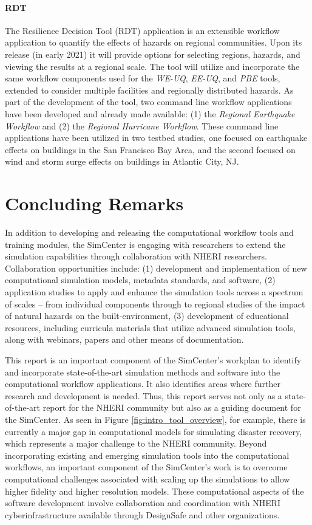 \paragraph{RDT} The Resilience Decision Tool (RDT) application is an extensible workflow application to quantify the effects of hazards on regional communities. Upon its release (in early 2021) it will provide options for selecting regions, hazards, and viewing the results at a regional scale. The tool will utilize and incorporate the same workflow components used for the \emph{WE-UQ}, \emph{EE-UQ}, and \emph{PBE} tools, extended to consider multiple facilities and regionally distributed hazards. As part of the development of the tool, two command line workflow applications have been developed and already made available: (1) the \emph{Regional Earthquake Workflow} and (2) the \emph{Regional Hurricane Workflow}.  These command line  applications have been utilized in two testbed studies, one focused on earthquake effects on buildings in the San Francisco Bay Area, and the second focused on wind and storm surge effects on buildings in Atlantic City, NJ.

\section{Concluding Remarks}

In addition to developing and releasing the computational workflow tools and training modules, the SimCenter is engaging with researchers to extend the simulation capabilities through collaboration with NHERI researchers. Collaboration opportunities include: (1) development and implementation of new computational simulation models, metadata standards, and software, (2) application studies to apply and enhance the simulation tools across a spectrum of scales – from individual components through to regional studies of the impact of natural hazards on the built-environment, (3) development of educational resources, including curricula materials that utilize advanced simulation tools, along with webinars, papers and other means of documentation. 

This report is an important component of the SimCenter’s workplan to identify and incorporate state-of-the-art simulation methods and software into the computational workflow applications. It also identifies areas where further research and development is needed.  Thus, this report serves not only as a state-of-the-art report for the NHERI community but also as a guiding document for the SimCenter.  As seen in Figure \ref{fig:intro_tool_overview}, for example, there is currently a major gap in computational models for simulating disaster recovery, which represents a major challenge to the NHERI community.  Beyond incorporating existing and emerging simulation tools into the computational workflows, an important component of the SimCenter’s work is to overcome computational challenges associated with scaling up the simulations to allow higher fidelity and higher resolution models.  These computational aspects of the software development involve collaboration and coordination with NHERI cyberinfrastructure available through DesignSafe and other organizations. 